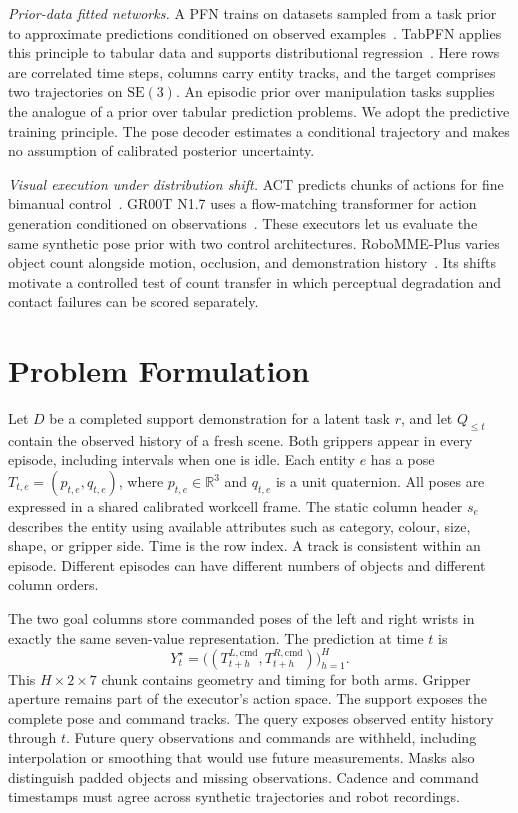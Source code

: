 \documentclass[letterpaper,10pt,conference]{ieeeconf}
\begin{document}
\textit{Prior-data fitted networks.}
A PFN trains on datasets sampled from a task prior to approximate predictions conditioned on observed examples~\cite{pfn}. TabPFN applies this principle to tabular data and supports distributional regression~\cite{tabpfn}. Here rows are correlated time steps, columns carry entity tracks, and the target comprises two trajectories on $\mathrm{SE}(3)$. An episodic prior over manipulation tasks supplies the analogue of a prior over tabular prediction problems. We adopt the predictive training principle. The pose decoder estimates a conditional trajectory and makes no assumption of calibrated posterior uncertainty.

\textit{Visual execution under distribution shift.}
ACT predicts chunks of actions for fine bimanual control~\cite{act}. GR00T N1.7 uses a flow-matching transformer for action generation conditioned on observations~\cite{groot}. These executors let us evaluate the same synthetic pose prior with two control architectures. RoboMME-Plus varies object count alongside motion, occlusion, and demonstration history~\cite{robomme}. Its shifts motivate a controlled test of count transfer in which perceptual degradation and contact failures can be scored separately.

\section{Problem Formulation}
Let $D$ be a completed support demonstration for a latent task $r$, and let $Q_{\le t}$ contain the observed history of a fresh scene. Both grippers appear in every episode, including intervals when one is idle. Each entity $e$ has a pose $T_{t,e}=(p_{t,e},q_{t,e})$, where $p_{t,e}\in\mathbb R^3$ and $q_{t,e}$ is a unit quaternion. All poses are expressed in a shared calibrated workcell frame. The static column header $s_e$ describes the entity using available attributes such as category, colour, size, shape, or gripper side. Time is the row index. A track is consistent within an episode. Different episodes can have different numbers of objects and different column orders.

The two goal columns store commanded poses of the left and right wrists in exactly the same seven-value representation. The prediction at time $t$ is
\begin{equation}
Y_t^\star =
\big((T^{L,\mathrm{cmd}}_{t+h}, T^{R,\mathrm{cmd}}_{t+h})\big)_{h=1}^{H}.
\label{eq:window}
\end{equation}
This $H\times2\times7$ chunk contains geometry and timing for both arms. Gripper aperture remains part of the executor's action space. The support exposes the complete pose and command tracks. The query exposes observed entity history through $t$. Future query observations and commands are withheld, including interpolation or smoothing that would use future measurements. Masks also distinguish padded objects and missing observations. Cadence and command timestamps must agree across synthetic trajectories and robot recordings.
\end{document}
